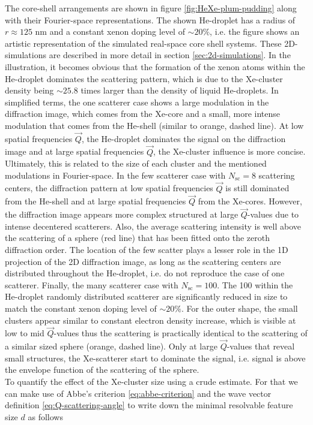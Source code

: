 The core-shell arrangements are shown in figure \ref{fig:HeXe-plum-pudding} along with their Fourier-space representations. The shown He-droplet has a radius of $r\approx 125$ nm and a constant xenon doping level of $\sim 20\%$, i.e. the figure shows an artistic representation of the simulated real-space core shell systems. These 2D-simulations are described in more detail in section \ref{sec:2d-simulations}. In the illustration, it becomes obvious that the formation of the xenon atoms within the He-droplet dominates the scattering pattern, which is due to the Xe-cluster density being $\sim 25.8$ times larger than the density of liquid He-droplets. In simplified terms, the one scatterer case shows a large modulation in the diffraction image, which comes from the Xe-core and a small, more intense modulation that comes from the He-shell (similar to orange, dashed line). At low spatial frequencies $\vec{Q}$, the He-droplet dominates the signal on the diffraction image and at large spatial frequencies $\vec{Q}$, the Xe-cluster influence is more concise. Ultimately, this is related to the size of each cluster and the mentioned modulations in Fourier-space. In the few scatterer case with $N_{\text{sc}}=8$ scattering centers, the diffraction pattern at low spatial frequencies $\vec{Q}$ is still dominated from the He-shell and at large spatial frequencies $\vec{Q}$ from the Xe-cores. However, the diffraction image appears more complex structured at large $\vec{Q}$-values due to intense decentered scatterers. Also, the average scattering intensity is well above the scattering of a sphere (red line) that has been fitted onto the zeroth diffraction order. The location of the few scatter plays a lesser role in the 1D projection of the 2D diffraction image, as long as the scattering centers are distributed throughout the He-droplet, i.e. do not reproduce the case of one scatterer. Finally, the many scatterer case with $N_{\text{sc}}=100$. The 100 within the He-droplet randomly distributed scatterer are significantly reduced in size to match the constant xenon doping level of $\sim 20 \%$. For the outer shape, the small clusters appear similar to constant electron density increase, which is visible at low to mid $\vec{Q}$-values thus the scattering is practically identical to the scattering of a similar sized sphere (orange, dashed line). Only at large $\vec{Q}$-values that reveal small structures, the Xe-scatterer start to dominate the signal, i.e. signal is above the envelope function of the scattering of the sphere.\\
To quantify the effect of the Xe-cluster size using a crude estimate. For that we can make use of Abbe's criterion \eqref{eq:abbe-criterion} and the wave vector definition \eqref{eq:Q-scattering-angle} to write down the minimal resolvable feature size $d$ as follows
